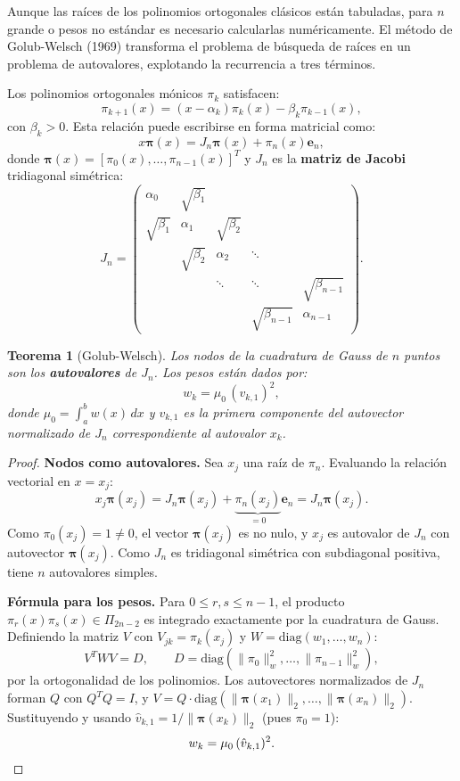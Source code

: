 \documentclass[a4paper,11pt]{report}
\newtheorem{theorem}{Teorema}[chapter]
\begin{document}
Aunque las raíces de los polinomios ortogonales clásicos están tabuladas, para $n$ grande o pesos no estándar es necesario calcularlas numéricamente. El método de Golub-Welsch (1969) transforma el problema de búsqueda de raíces en un problema de autovalores, explotando la recurrencia a tres términos.

Los polinomios ortogonales mónicos $\pi_k$ satisfacen:
\[
\pi_{k+1}(x) = (x - \alpha_k) \pi_k(x) - \beta_k \pi_{k-1}(x),
\]
con $\beta_k > 0$. Esta relación puede escribirse en forma matricial como:
\[
x \mathbf{\pi}(x) = J_n \mathbf{\pi}(x) + \pi_n(x) \mathbf{e}_n,
\]
donde $\mathbf{\pi}(x) = [\pi_0(x), \ldots, \pi_{n-1}(x)]^T$ y $J_n$ es la \textbf{matriz de Jacobi} tridiagonal simétrica:
\[
J_n = \begin{pmatrix}
\alpha_0 & \sqrt{\beta_1} & & & \\
\sqrt{\beta_1} & \alpha_1 & \sqrt{\beta_2} & & \\
& \sqrt{\beta_2} & \alpha_2 & \ddots & \\
& & \ddots & \ddots & \sqrt{\beta_{n-1}} \\
& & & \sqrt{\beta_{n-1}} & \alpha_{n-1}
\end{pmatrix}.
\]

\begin{theorem}[Golub-Welsch]
Los nodos de la cuadratura de Gauss de $n$ puntos son los \textbf{autovalores} de $J_n$. Los pesos están dados por:
\[
w_k = \mu_0\,(v_{k,1})^2,
\]
donde $\mu_0 = \int_a^b w(x)\,dx$ y $v_{k,1}$ es la primera componente del autovector normalizado de $J_n$ correspondiente al autovalor $x_k$.
\end{theorem}

\begin{proof}
\textbf{Nodos como autovalores.}\; Sea $x_j$ una raíz de $\pi_n$.  Evaluando la relación vectorial en $x = x_j$:
\[
x_j \mathbf{\pi}(x_j) = J_n \mathbf{\pi}(x_j) + \underbrace{\pi_n(x_j)}_{=0} \mathbf{e}_n = J_n \mathbf{\pi}(x_j).
\]
Como $\pi_0(x_j) = 1 \neq 0$, el vector $\mathbf{\pi}(x_j)$ es no nulo, y $x_j$ es autovalor de $J_n$ con autovector $\mathbf{\pi}(x_j)$.  Como $J_n$ es tridiagonal simétrica con subdiagonal positiva, tiene $n$ autovalores simples.

\medskip
\textbf{Fórmula para los pesos.}\; Para $0 \leq r, s \leq n-1$, el producto $\pi_r(x)\pi_s(x) \in \Pi_{2n-2}$ es integrado exactamente por la cuadratura de Gauss.  Definiendo la matriz $V$ con $V_{jk} = \pi_k(x_j)$ y $W = \mathrm{diag}(w_1, \ldots, w_n)$:
\[
V^T W V = D, \qquad D = \mathrm{diag}(\|\pi_0\|_w^2, \ldots, \|\pi_{n-1}\|_w^2),
\]
por la ortogonalidad de los polinomios.  Los autovectores normalizados de $J_n$ forman $Q$ con $Q^TQ = I$, y $V = Q \cdot \mathrm{diag}(\|\mathbf{\pi}(x_1)\|_2, \ldots, \|\mathbf{\pi}(x_n)\|_2)$.  Sustituyendo y usando $\hat{v}_{k,1} = 1/\|\mathbf{\pi}(x_k)\|_2$ (pues $\pi_0 = 1$):
\[
w_k = \mu_0\,(\hat{v}_{k,1})^2. \qedhere
\]
\end{proof}
\end{document}
